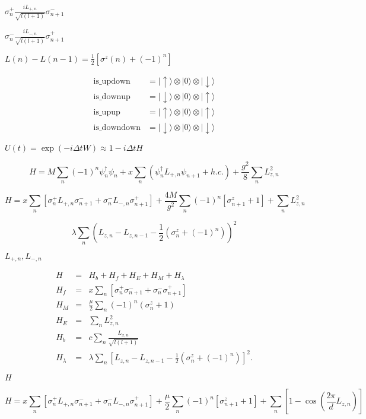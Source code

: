 \documentclass{article}
\begin{document}
{$ \sigma^+_{n}\frac{iL_{+,n}}{\sqrt{l(l+1)}}\sigma^-_{n+1} $
\pagebreak

$ \sigma^-_{n}\frac{iL_{-,n}}{\sqrt{l(l+1)}}\sigma^+_{n+1} $
\pagebreak

$ L(n)-L(n-1) = \frac{1}{2}\left[\sigma^z(n)+(-1)^n\right]$
\pagebreak

\begin{eqnarray*} \mathrm{is\_updown} &= |\uparrow\rangle\otimes |0\rangle\otimes |\downarrow\rangle \\ \mathrm{is\_downup} &= |\downarrow\rangle\otimes |0\rangle\otimes |\uparrow\rangle \\ \mathrm{is\_upup} &= |\uparrow\rangle\otimes |0\rangle\otimes |\uparrow\rangle \\ \mathrm{is\_downdown} &= |\downarrow\rangle\otimes |0\rangle\otimes |\downarrow\rangle \end{eqnarray*}
\pagebreak

$ U(t)=\exp(-i\Delta t W)\approx 1 - i\Delta t H $
\pagebreak

\[ H = M\sum_n (-1)^n\psi_n^\dagger\psi_n + x\sum_n \left(\psi_n^\dagger L_{+,n}\psi_{n+1}+h.c.\right)+\frac{g^2}{8}\sum_n L_{z,n}^2\]
\pagebreak

\[H = x\sum_n\left[\sigma^+_n L_{+,n}\sigma_{n+1}^- + \sigma^-_n L_{-,n}\sigma_{n+1}^+\right] + \frac{4M}{g^2}\sum_n(-1)^n\left[ \sigma^z_{n+1}+1\right] + \sum_n L_{z,n}^2 \]
\pagebreak

\[ \lambda \sum_n\left( L_{z,n} - L_{z,n-1} -\frac{1}{2}\left(\sigma^z_n +(-1)^n\right)\right)^2\]
\pagebreak

$ L_{+,n},L_{-,n} $
\pagebreak

\begin{eqnarray*} H &=& H_b + H_f + H_E + H_M + H_\lambda \\ H_f &=& x\sum_n\left[\sigma_n^+\sigma_{n+1}^- + \sigma_n^-\sigma_{n+1}^+\right]\\ H_M &=& \frac{\mu}{2}\sum_n(-1)^n\left(\sigma_n^z+1\right)\\ H_E &=& \sum_n L_{z,n}^2 \\ H_b &=& c\sum_n\frac{L_{x,n}}{\sqrt{l(l+1)}}\\ H_\lambda &=& \lambda\sum_n\left[L_{z,n}-L_{z,n-1}-\frac{1}{2}\left(\sigma^z_n+(-1)^n\right)\right]^2. \end{eqnarray*}
\pagebreak

$ H $
\pagebreak

\[ H = x\sum_n\left[\sigma^+_n L_{+,n}\sigma_{n+1}^- + \sigma^-_n L_{-,n}\sigma_{n+1}^+\right] + \frac{\mu}{2}\sum_n(-1)^n\left[ \sigma^z_{n+1}+1\right] + \sum_n \left[1-\cos\left(\frac{2\pi}{d}L_{z,n}\right)\right]\]
\pagebreak

}
\end{document}
